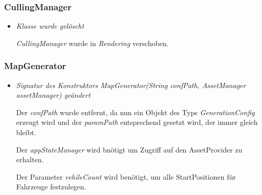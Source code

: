 \subsubsection{CullingManager}
\begin{itemize}
    \item \textit{Klasse wurde gelöscht}
        \begin{leftbar}[0.9\linewidth]
            \textit{CullingManager} wurde in \textit{Rendering} verschoben.
        \end{leftbar}
\end{itemize}

\subsubsection{MapGenerator}
\begin{itemize}
    \item \textit{Signatur des Konstruktors MapGenerator(String confPath, AssetManager assetManager) geändert}
        \begin{leftbar}[0.9\linewidth]
            Der \textit{confPath} wurde entfernt, da nun ein Objekt des Typs \textit{GenerationConfig} erzeugt wird
            und der \textit{paramPath} entsprechend gesetzt wird, der immer gleich bleibt.\par

            Der \textit{appStateManager} wird bnötigt um Zugriff auf den AssetProvider zu erhalten.\par

            Der Parameter \textit{vehileCount} wird benötigt, um alle StartPositionen für Fahrzeuge festzulegen.
        \end{leftbar}
\end{itemize}

